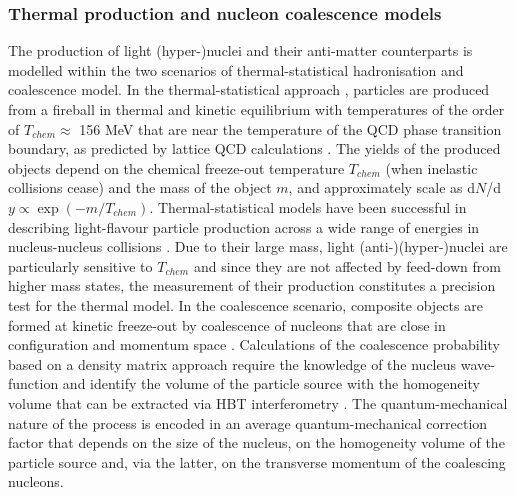 \subsubsection{Thermal production and nucleon coalescence models}
The production of light (hyper-)nuclei and their anti-matter counterparts is modelled within the two scenarios of thermal-statistical hadronisation and coalescence model.
In the thermal-statistical approach \cite{Andronic:2010qu, Andronic:2017}, particles are produced from a fireball in thermal and kinetic equilibrium with temperatures of the order of $T_{chem} \approx$ 156 MeV that are near the temperature of the QCD phase transition boundary, as predicted by lattice QCD calculations \cite{Bazavov:2014pvz,Bellwied:2013cta}.
The yields of the produced objects depend on the chemical freeze-out temperature $T_{chem}$ (when inelastic collisions cease) and the mass of the object $m$, and approximately scale as d$N$/d$y \propto \exp(-m/T_{chem})$.  
Thermal-statistical models have been successful in describing light-flavour particle production across a wide range of energies in nucleus-nucleus collisions \cite{Andronic:2017, Acharya:2017bso}.  
Due to their large mass, light (anti-)(hyper-)nuclei are particularly sensitive to $T_{chem}$ and since they are not affected by feed-down from higher mass states, the measurement of their production constitutes a precision test for the thermal model.  
In the coalescence scenario, composite objects are formed at kinetic freeze-out by coalescence of nucleons that are close in configuration and momentum space \cite{Butler:1963, Kapusta:1980, Bergstrom:1979gpv, Sato:1981ez, Nagle:1996vp, Scheibl:1998tk}. Calculations of the coalescence probability based on a density matrix approach \cite{Scheibl:1998tk} require the knowledge of the nucleus wave-function and identify the volume of the particle source with the homogeneity volume that can be extracted via HBT interferometry \cite{Wiedemann:1999qn}. 
The quantum-mechanical nature of the process is encoded in an average quantum-mechanical correction factor that depends on the size of the nucleus, on the homogeneity volume of the particle source and, via the latter, on the transverse momentum of the coalescing nucleons.

